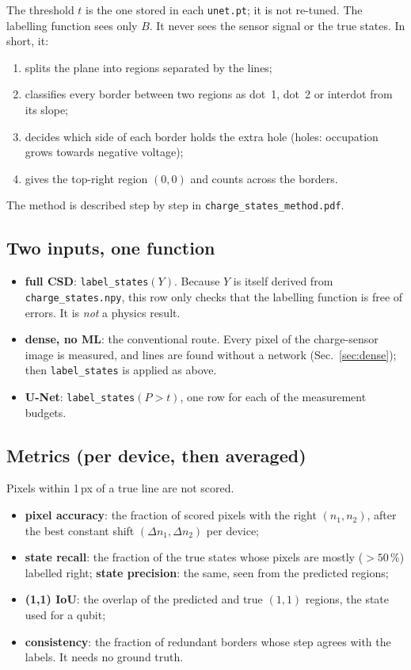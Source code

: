 \documentclass[10pt,a4paper]{article}
\begin{document}
\noindent
The threshold $t$ is the one stored in each \texttt{unet.pt}; it is not
re-tuned.  The labelling function sees only $B$.  It never sees the sensor
signal or the true states.  In short, it:
\begin{enumerate}
\item splits the plane into regions separated by the lines;
\item classifies every border between two regions as dot~1, dot~2 or
  interdot from its slope;
\item decides which side of each border holds the extra hole (holes:
  occupation grows towards negative voltage);
\item gives the top-right region $(0,0)$ and counts across the borders.
\end{enumerate}
The method is described step by step in \texttt{charge\_states\_method.pdf}.

\subsection*{Two inputs, one function}
\begin{itemize}
\item \textbf{full CSD}: \texttt{label\_states}$(Y)$.  Because $Y$ is itself
  derived from \texttt{charge\_states.npy}, this row only checks that the
  labelling function is free of errors.  It is \emph{not} a physics result.
\item \textbf{dense, no ML}: the conventional route.  Every pixel of the
  charge-sensor image is measured, and lines are found without a network
  (Sec.~\ref{sec:dense}); then \texttt{label\_states} is applied as above.
\item \textbf{U-Net}: \texttt{label\_states}$(P>t)$, one row for each of the
  \vAN{} measurement budgets.
\end{itemize}

\subsection*{Metrics (per device, then averaged)}
Pixels within 1\,px of a true line are not scored.
\begin{itemize}
\item \textbf{pixel accuracy}: the fraction of scored pixels with the right
  $(n_1,n_2)$, after the best constant shift $(\Delta n_1,\Delta n_2)$ per
  device;
\item \textbf{state recall}: the fraction of the true states whose pixels
  are mostly ($>50\,\%$) labelled right; \textbf{state precision}: the same,
  seen from the predicted regions;
\item \textbf{(1,1) IoU}: the overlap of the predicted and true $(1,1)$
  regions, the state used for a qubit;
\item \textbf{consistency}: the fraction of redundant borders whose step
  agrees with the labels.  It needs no ground truth.
\end{itemize}
\end{document}
